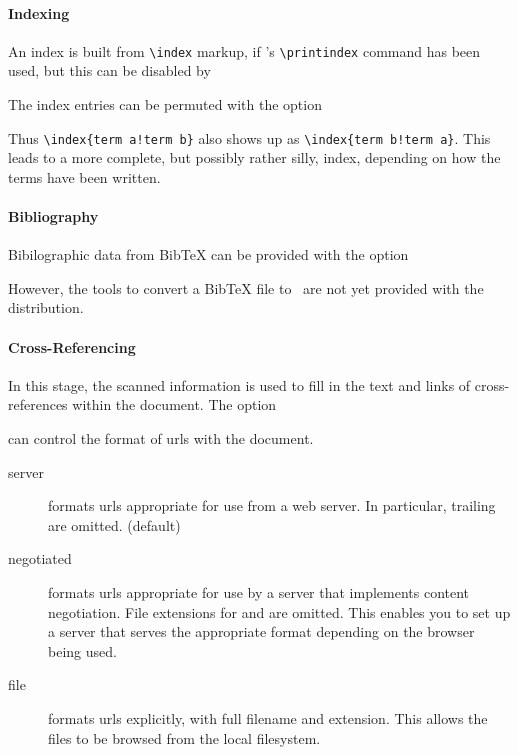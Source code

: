 \documentclass{book}
\begin{document}
\paragraph{Indexing}
An index is built from \verb|\index| markup, if
's \verb|\printindex| command has been used,
but this can be disabled by
\begin{quote}
\end{quote}
The index entries can be permuted with the option
\begin{quote}
\end{quote}
Thus \verb|\index{term a!term b}| also shows up as \verb|\index{term b!term a}|.
This leads to a more complete, but possibly rather silly, index,
depending on how the terms have been written.

\paragraph{Bibliography}
Bibilographic data from BibTeX can be provided with the option
\begin{quote}
\end{quote}
However, the tools to convert a BibTeX file to \XML\ are
not yet provided with the distribution.

\paragraph{Cross-Referencing}
In this stage, the scanned information is used to fill in the
text and links of cross-references within the document.
The option
\begin{quote}
\end{quote}
can control the format of urls with the document.
\begin{description}
  \item[server] formats urls appropriate for use from a web server.
    In particular, trailing  are omitted. (default)
  \item[negotiated] formats urls appropriate for use by a server
    that implements content negotiation. File extensions for 
    and  are omitted.  This enables you to set up a server
    that serves the appropriate format depending on the browser being used.
  \item[file] formats urls explicitly, with full filename and extension.
    This allows the files to be browsed from the local filesystem.
\end{description}
\end{document}
